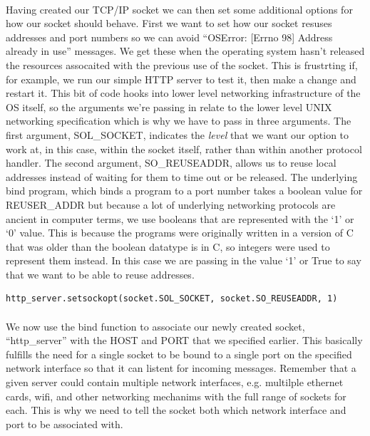 \paragraph{} Having created our TCP/IP socket we can then set some additional options for how our socket should behave. First we want to set how our socket resuses addresses and port numbers so we can avoid ``OSError: [Errno 98] Address already in use'' messages. We get these when the operating system hasn't released the resources assocaited with the previous use of the socket. This is frustrting if, for example, we run our simple HTTP server to test it, then make a change and restart it. This bit of code hooks into lower level networking infrastructure of the OS itself, so the arguments we're passing in relate to the lower level UNIX networking specification which is why we have to pass in three arguments. The first argument, SOL\_SOCKET, indicates the \emph{level} that we want our option to work at, in this case, within the socket itself, rather than within another protocol handler. The second argument, SO\_REUSEADDR, allows us to reuse local addresses instead of waiting for them to time out or be released. The underlying bind program, which binds a program to a port number takes a boolean value for REUSER\_ADDR but because a lot of underlying networking protocols are ancient in computer terms, we use booleans that are represented with the `1' or `0' value. This is because the programs were originally written in a version of C that was older than the boolean datatype is in C, so integers were used to represent them instead. In this case we are passing in the value `1' or True to say that we want to be able to reuse addresses.

\begin{lstlisting}[style=CODE]
http_server.setsockopt(socket.SOL_SOCKET, socket.SO_REUSEADDR, 1)
\end{lstlisting}

\paragraph{} We now use the bind function to associate our newly created socket, ``http\_server'' with the HOST and PORT that we specified earlier. This basically fulfills the need for a single socket to be bound to a single port on the specified network interface so that it can listent for incoming messages. Remember that a given server could contain multiple network interfaces, e.g. multilple ethernet cards, wifi, and other networking mechanims with the full range of sockets for each. This is why we need to tell the socket both which network interface and port to be associated with.

